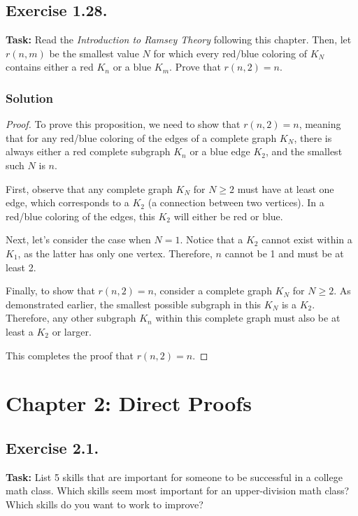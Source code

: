 \documentclass{article}
\begin{document}
\newpage

\subsection{Exercise 1.28.} 
\textbf{Task:} Read the \textit{Introduction to Ramsey Theory} following this chapter. Then, let $r(n,m)$ be the smallest value $N$ for which every red/blue coloring of $K_N$ contains either a red $K_n$ or a blue $K_m$. Prove that $r(n,2)=n$.

\subsubsection*{Solution}

\begin{proof}
To prove this proposition, we need to show that \( r(n,2) = n \), meaning that for any red/blue coloring of the edges of a complete graph \( K_N \), there is always either a red complete subgraph \( K_n \) or a blue edge \(K_2\), and the smallest such \(N\) is \( n \).

First, observe that any complete graph \( K_N \) for \( N \geq 2 \) must have at least one edge, which corresponds to a \( K_2 \) (a connection between two vertices). In a red/blue coloring of the edges, this \( K_2 \) will either be red or blue.

Next, let's consider the case when \( N = 1 \). Notice that a \( K_2 \) cannot exist within a \( K_1 \), as the latter has only one vertex. Therefore, \( n \) cannot be 1 and must be at least 2. 

Finally, to show that \( r(n,2) = n \), consider a complete graph \( K_N \) for \( N \geq 2 \). As demonstrated earlier, the smallest possible subgraph in this \( K_N \) is a \( K_2 \). Therefore, any other subgraph \( K_n \) within this complete graph must also be at least a \( K_2 \) or larger.

This completes the proof that \( r(n,2) = n \).
\end{proof}

\newpage

\section{Chapter 2: Direct Proofs}

\subsection{Exercise 2.1.}
\textbf{Task:} List 5 skills that are important for someone to be successful in a college math class. Which skills seem most important for an upper-division math class? Which skills do you want to work to improve?
\end{document}
